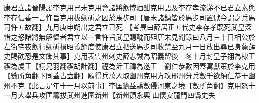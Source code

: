 康君立詣晉陽謁李克用己未克用會諸將飲博酒酣克用語及李存孝流涕不已君立素與李存信善一言忤旨克用拔劒斫之囚於馬步司【唐末諸鎮皆於馬步司置獄今謂之兵馬司忤五故翻】九月庚申朔出之君立已死　【考異曰薛居正五代史李存孝既死武皇深惜之怒諸將無解愠者君立以一言忤旨武皇賜酖而殂唐末見聞錄曰八月三十日相公於左街宅夜飲行劒斫損昭義節度使康君立把送馬步司收禁至九月一日放出尋已身薨薛史賜酖恐是文飾其事】克用表雲州刺史薛志誠為昭義留後　冬十月封皇子祤為棣王禊為䖍王【祤兄羽翻禊胡計翻】禋為沂王禕為遂王　劉仁恭數因蓋寓獻策於李克用【數所角翻下同蓋古盍翻】願得兵萬人取幽州克用方攻邢州分兵數千欲納仁恭于幽州不克【此言是年十一月以前事】李匡籌益驕數侵河東之境【數所角翻】克用怒十一月大舉兵攻匡籌拔武州進圍新州【新州領永興山懷安龍門四縣史失